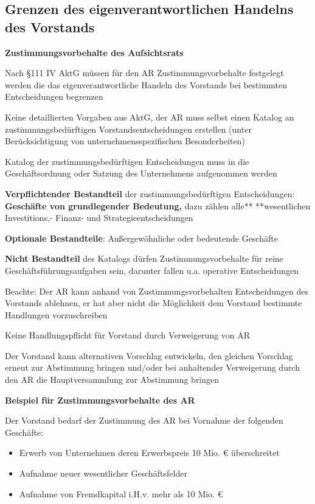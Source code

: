 \documentclass[
]{article}
\providecommand{\tightlist}{%
  \setlength{\itemsep}{0pt}\setlength{\parskip}{0pt}}
\begin{document}
\hypertarget{grenzen-des-eigenverantwortlichen-handelns-des-vorstands}{%
\subsection{Grenzen des eigenverantwortlichen Handelns des
Vorstands}\label{grenzen-des-eigenverantwortlichen-handelns-des-vorstands}}

\textbf{Zustimmungsvorbehalte des Aufsichtsrats}

Nach §111 IV AktG müssen für den AR Zustimmungsvorbehalte festgelegt
werden die das eigenverantwortliche Handeln des Vorstands bei bestimmten
Entscheidungen begrenzen

Keine detaillierten Vorgaben aus AktG, der AR muss selbst einen Katalog
an zustimmungsbedürftigen Vorstandsentscheidungen erstellen (unter
Berücksichtigung von unternehmensspezifischen Besonderheiten)

Katalog der zustimmungsbedürftigen Entscheidungen muss in die
Geschäftsordnung oder Satzung des Unternehmens aufgenommen werden

\textbf{Verpflichtender Bestandteil} der zustimmungsbedürftigen
Entscheidungen: \textbf{Geschäfte von grundlegender Bedeutung, }dazu
zählen alle** **wesentlichen Investitions,- Finanz- und
Strategieentscheidungen

\textbf{Optionale Bestandteile}: Außergewöhnliche oder bedeutende
Geschäfte

\textbf{Nicht Bestandteil} des Katalogs dürfen Zustimmungsvorbehalte für
reine Geschäftsführungsaufgaben sein, darunter fallen u.a. operative
Entscheidungen

Beachte: Der AR kann anhand von Zustimmungsvorbehalten Entscheidungen
des Vorstands ablehnen, er hat aber nicht die Möglichkeit dem Vorstand
bestimmte Handlungen vorzuschreiben

Keine Handlungspflicht für Vorstand durch Verweigerung von AR

Der Vorstand kann alternativen Vorschlag entwickeln, den gleichen
Vorschlag erneut zur Abstimmung bringen und/oder bei anhaltender
Verweigerung durch den AR die Hauptversammlung zur Abstimmung bringen

\textbf{Beispiel für Zustimmungsvorbehalte des AR}

Der Vorstand bedarf der Zustimmung des AR bei Vornahme der folgenden
Geschäfte:

\begin{itemize}
\tightlist
\item
  Erwerb von Unternehmen deren Erwerbspreis 10 Mio. € überschreitet
\item
  Aufnahme neuer wesentlicher Geschäftsfelder
\item
  Aufnahme von Fremdkapital i.H.v. mehr als 10 Mio. €
\end{itemize}
\end{document}
